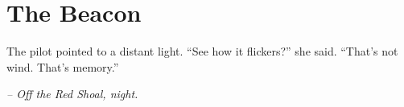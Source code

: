 \chapter*{The Beacon}

The pilot pointed to a distant light. “See how it flickers?” she said. “That’s not wind. That’s memory.”

\smallskip

\noindent \textit{– Off the Red Shoal, night.}

